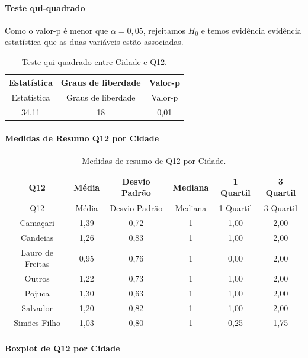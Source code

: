\documentclass[]{article}
\let\oldparagraph\paragraph
\renewcommand{\paragraph}[1]{\oldparagraph{#1}\mbox{}}
\begin{document}
\hypertarget{teste-qui-quadrado-2}{%
\paragraph{Teste qui-quadrado}\label{teste-qui-quadrado-2}}

Como o valor-p é menor que \(\alpha=0,05\), rejeitamos \(H_0\) e temos evidência evidência estatística que as duas variáveis estão associadas.

\begin{longtable}[]{@{}ccc@{}}
\caption{\label{tab:unnamed-chunk-19}Teste qui-quadrado entre Cidade e Q12.}\tabularnewline
\toprule
Estatística & Graus de liberdade & Valor-p\tabularnewline
\midrule
\endfirsthead
\toprule
Estatística & Graus de liberdade & Valor-p\tabularnewline
\midrule
\endhead
34,11 & 18 & 0,01\tabularnewline
\bottomrule
\end{longtable}

\cleardoublepage

\hypertarget{medidas-de-resumo-q12-por-cidade}{%
\paragraph{Medidas de Resumo Q12 por Cidade}\label{medidas-de-resumo-q12-por-cidade}}

\begin{longtable}[]{@{}cccccc@{}}
\caption{\label{tab:unnamed-chunk-20}Medidas de resumo de Q12 por Cidade.}\tabularnewline
\toprule
Q12 & Média & Desvio Padrão & Mediana & 1 Quartil & 3 Quartil\tabularnewline
\midrule
\endfirsthead
\toprule
Q12 & Média & Desvio Padrão & Mediana & 1 Quartil & 3 Quartil\tabularnewline
\midrule
\endhead
Camaçari & 1,39 & 0,72 & 1 & 1,00 & 2,00\tabularnewline
Candeias & 1,26 & 0,83 & 1 & 1,00 & 2,00\tabularnewline
Lauro de Freitas & 0,95 & 0,76 & 1 & 0,00 & 2,00\tabularnewline
Outros & 1,22 & 0,73 & 1 & 1,00 & 2,00\tabularnewline
Pojuca & 1,30 & 0,63 & 1 & 1,00 & 2,00\tabularnewline
Salvador & 1,20 & 0,82 & 1 & 1,00 & 2,00\tabularnewline
Simões Filho & 1,03 & 0,80 & 1 & 0,25 & 1,75\tabularnewline
\bottomrule
\end{longtable}

\hypertarget{boxplot-de-q12-por-cidade}{%
\paragraph{Boxplot de Q12 por Cidade}\label{boxplot-de-q12-por-cidade}}
\end{document}
